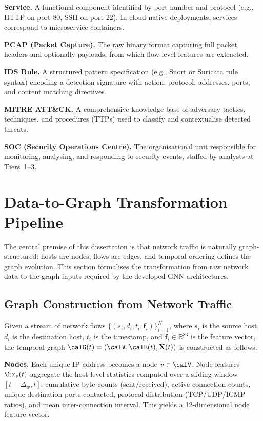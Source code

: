\noindent\textbf{Service.} A functional component identified by port number and protocol (e.g., HTTP on port 80, SSH on port 22). In cloud-native deployments, services correspond to microservice containers.

\noindent\textbf{PCAP (Packet Capture).} The raw binary format capturing full packet headers and optionally payloads, from which flow-level features are extracted.

\noindent\textbf{IDS Rule.} A structured pattern specification (e.g., Snort or Suricata rule syntax) encoding a detection signature with action, protocol, addresses, ports, and content matching directives.

\noindent\textbf{MITRE ATT\&CK.} A comprehensive knowledge base of adversary tactics, techniques, and procedures (TTPs) used to classify and contextualise detected threats.

\noindent\textbf{SOC (Security Operations Centre).} The organisational unit responsible for monitoring, analysing, and responding to security events, staffed by analysts at Tiers~1--3.


\section{Data-to-Graph Transformation Pipeline}
\label{sec:data_to_graph}

The central premise of this dissertation is that network traffic is naturally graph-structured: hosts are nodes, flows are edges, and temporal ordering defines the graph evolution. This section formalises the transformation from raw network data to the graph inputs required by the developed GNN architectures.

\subsection{Graph Construction from Network Traffic}

Given a stream of network flows $\{(s_i, d_i, t_i, \mathbf{f}_i)\}_{i=1}^{N}$, where $s_i$ is the source host, $d_i$ is the destination host, $t_i$ is the timestamp, and $\mathbf{f}_i\in\mathbb{R}^{83}$ is the feature vector, the temporal graph $\calG(t)=(\calV,\calE(t),\mathbf{X}(t))$ is constructed as follows:

\noindent\textbf{Nodes.} Each unique IP address becomes a node $v\in\calV$. Node features $\bx_v(t)$ aggregate the host-level statistics computed over a sliding window $[t-\Delta_w, t]$: cumulative byte counts (sent/received), active connection counts, unique destination ports contacted, protocol distribution (TCP/UDP/ICMP ratios), and mean inter-connection interval. This yields a 12-dimensional node feature vector.

